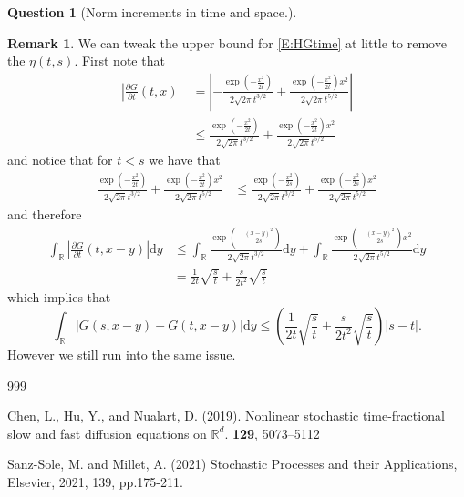 \documentclass[a4paper,11pt]{article}
\numberwithin{equation}{section}
\theoremstyle{plain}
\theoremstyle{definition}
\newtheorem{question}{Question}
\newtheorem{remark}[theorem]{Remark}
\newcommand{\ud}{\ensuremath{\mathrm{d} }}
\newcommand{\R}{\mathbb{R}}
\begin{document}
\begin{question}[Norm increments in time and space.]
	\begin{remark}
		We can tweak the upper bound for \eqref{E:HGtime} at little to remove the $\eta(t,s)$. First note that 
			\begin{align*}
			\left|\frac{\partial G}{\partial t}(t, x )\right| & = \left| -\frac{\exp\left(-\frac{x^2}{2t}\right)}{2\sqrt{2 \pi} t^{3/2}} + \frac{\exp\left(-\frac{x^2}{2t}\right) x^2}{2\sqrt{2 \pi} t^{5/2} }\right| \\
			& \le \frac{\exp\left(-\frac{x^2}{2t}\right)}{2\sqrt{2 \pi} t^{3/2}}  + \frac{\exp\left(-\frac{x^2}{2t}\right) x^2}{2\sqrt{2 \pi} t^{5/2} }
			\end{align*}
		and notice that for $t < s$ we have that 
		\begin{align*}
			\frac{\exp\left(-\frac{x^2}{2t}\right)}{2\sqrt{2 \pi} t^{3/2}}  + \frac{\exp\left(-\frac{x^2}{2t}\right) x^2}{2\sqrt{2 \pi} t^{5/2} } & \le
			 \frac{\exp\left(-\frac{x^2}{2s}\right)}{2\sqrt{2 \pi} t^{3/2}}  + \frac{\exp\left(-\frac{x^2}{2s}\right) x^2}{2\sqrt{2 \pi} t^{5/2} }
		\end{align*}
		and therefore 
		\begin{align*}
			\int_{\R}\left|\frac{\partial G}{\partial t}(t, x -y)\right|\ud y  & \le 		 \int_{\R} \frac{\exp\left(-\frac{(x-y)^2}{2s}\right)}{2\sqrt{2 \pi} t^{3/2}}  \ud y+ \int_{\R} \frac{\exp\left(-\frac{(x-y)^2}{2s}\right) x^2}{2\sqrt{2 \pi} t^{5/2} } \ud y \\
			&= \frac{1}{2t}\sqrt{\frac{s}{t}} + \frac{s}{2t^2}\sqrt{\frac{s}{t}}
		\end{align*}
		which implies that 
		\[
				\int_{\R}|G(s,x-y) - G(t,x-y)| \ud y \le \left(\frac{1}{2t}\sqrt{\frac{s}{t}} + \frac{s}{2t^2}\sqrt{\frac{s}{t}}\right)|s-t|.
		\]
	However we still run into the same issue. 
	\end{remark}
		
\end{question}


	
	
	\begin{thebibliography}{999}
		
		Chen, L., Hu, Y., and Nualart, D. (2019).
		\newblock Nonlinear stochastic time-fractional slow and fast diffusion equations on $\R^d$.
		 \textbf{129}, 5073--5112
		
		Sanz-Sole, M. and Millet, A. (2021)
		\newblock Stochastic Processes and their Applications, Elsevier, 2021, 139, pp.175-211.
	\end{thebibliography}
	
\end{document}
